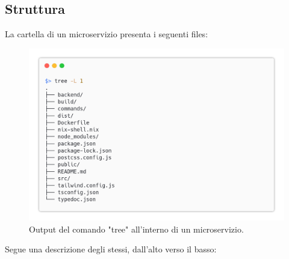 \documentclass{report}
\begin{document}
\subsection{Struttura}

La cartella di un microservizio presenta i seguenti files:
\begin{figure}[H]
	\centering\includegraphics[width=1\textwidth]{images/structure.png}
	Output del comando "tree" all'interno di un microservizio.
\end{figure}
Segue una descrizione degli stessi, dall'alto verso il basso:
\end{document}
